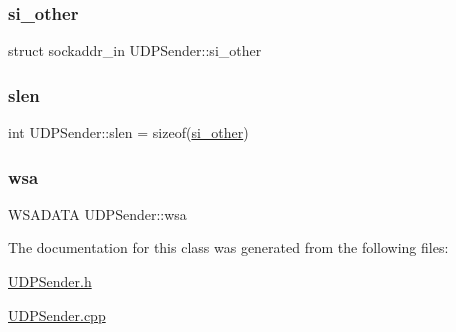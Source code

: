 \hypertarget{class_u_d_p_sender_abeda008425d14ea8092d23d23bbd1117}{}\label{class_u_d_p_sender_abeda008425d14ea8092d23d23bbd1117} 
\subsubsection{\texorpdfstring{si\+\_\+other}{si\_other}}
{\footnotesize\ttfamily struct sockaddr\+\_\+in U\+D\+P\+Sender\+::si\+\_\+other}

\hypertarget{class_u_d_p_sender_a44e4545b002409e774edb7e30653d53e}{}\label{class_u_d_p_sender_a44e4545b002409e774edb7e30653d53e} 
\subsubsection{\texorpdfstring{slen}{slen}}
{\footnotesize\ttfamily int U\+D\+P\+Sender\+::slen = sizeof(\hyperlink{class_u_d_p_sender_abeda008425d14ea8092d23d23bbd1117}{si\+\_\+other})}

\hypertarget{class_u_d_p_sender_afc9fc0d12ba056af8f66ee738c5bbe98}{}\label{class_u_d_p_sender_afc9fc0d12ba056af8f66ee738c5bbe98} 
\subsubsection{\texorpdfstring{wsa}{wsa}}
{\footnotesize\ttfamily W\+S\+A\+D\+A\+TA U\+D\+P\+Sender\+::wsa}



The documentation for this class was generated from the following files\+:\begin{DoxyCompactItemize}
\item 
\hyperlink{_u_d_p_sender_8h}{U\+D\+P\+Sender.\+h}\item 
\hyperlink{_u_d_p_sender_8cpp}{U\+D\+P\+Sender.\+cpp}\end{DoxyCompactItemize}
